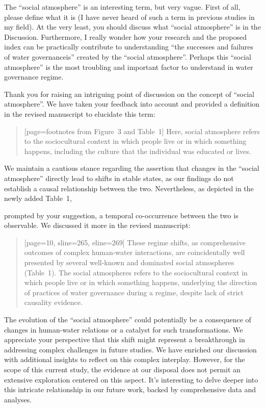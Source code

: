 \RC{} The ``social atmosphere'' is an interesting term, but very vague. First of all, please define what it is (I have never heard of such a term in previous studies in my field). At the very least, you should discuss what ``social atmosphere'' is in the Discussion. Furthermore, I really wonder how your research and the proposed index can be practically contribute to understanding ``the successes and failures of water governanceis'' created by the ``social atmosphere''. Perhaps this ``social atmosphere'' is the most troubling and important factor to understand in water governance regime.

\AR{} Thank you for raising an intriguing point of discussion on the concept of ``social atmosphere''. We have taken your feedback into account and provided a definition in the revised manuscript to elucidate this term:

\begin{quote}[page=footnotes from Figure~3 and Table~1]
    Here, social atmosphere refers to the sociocultural context in which people live or in which something happens, including the culture that the individual was educated or lives.
\end{quote}

\AR*{} We maintain a cautious stance regarding the assertion that changes in the ``social atmosphere'' directly lead to shifts in stable states, as our findings do not establish a causal relationship between the two. Nevertheless, as depicted in the newly added Table~1,



\AR*{} prompted by your suggestion, a temporal co-occurrence between the two is observable. We discussed it more in the revised manuscript:

\begin{quote}[page=10, sline=265, eline=269]
    These regime shifts, as comprehensive outcomes of complex human-water interactions, are coincidentally well presented by several well-known and dominated social atmospheres (Table~1).
    The social atmospheres refers to the sociocultural context in which people live or in which something happens, underlying the direction of practices of water governance during a regime, despite lack of strict causality evidence.
\end{quote}

\AR*{} The evolution of the ``social atmosphere'' could potentially be a consequence of changes in human-water relations or a catalyst for such transformations. We appreciate your perspective that this shift might represent a breakthrough in addressing complex challenges in future studies. We have enriched our discussion with additional insights to reflect on this complex interplay. However, for the scope of this current study, the evidence at our disposal does not permit an extensive exploration centered on this aspect. It's interesting to delve deeper into this intricate relationship in our future work, backed by comprehensive data and analyses.

